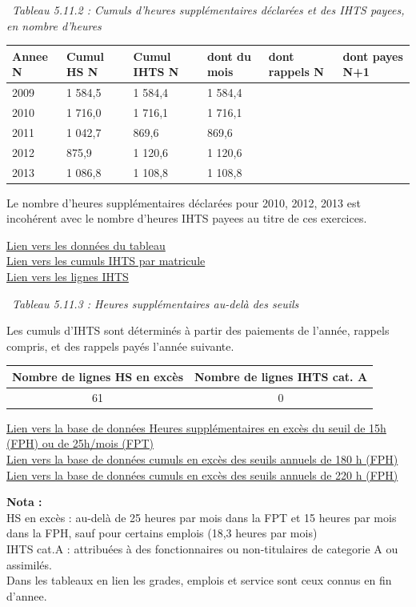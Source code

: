 ~\emph{Tableau 5.11.2 : Cumuls d'heures supplémentaires déclarées et des
IHTS payees, en nombre d'heures}

\begin{longtable}[]{@{}llllll@{}}
\toprule
Annee N & Cumul HS N & Cumul IHTS N & dont du mois & dont rappels N &
dont payes N+1\tabularnewline
\midrule
\endhead
2009 & 1 584,5 & 1 584,4 & 1 584,4 & &\tabularnewline
2010 & 1 716,0 & 1 716,1 & 1 716,1 & &\tabularnewline
2011 & 1 042,7 & 869,6 & 869,6 & &\tabularnewline
2012 & 875,9 & 1 120,6 & 1 120,6 & &\tabularnewline
2013 & 1 086,8 & 1 108,8 & 1 108,8 & &\tabularnewline
\bottomrule
\end{longtable}

Le nombre d'heures supplémentaires déclarées pour 2010, 2012, 2013 est
incohérent avec le nombre d'heures IHTS payees au titre de ces
exercices.

\href{../Bases/Reglementation/CumHS.csv}{Lien vers les données du
tableau}\\
\href{../Bases/Reglementation/lignes.IHTS.tot.csv}{Lien vers les cumuls
IHTS par matricule}\\
\href{../Bases/Reglementation/lignes.IHTS.csv}{Lien vers les lignes IHTS}

~\emph{Tableau 5.11.3 : Heures supplémentaires au-delà des seuils}

Les cumuls d'IHTS sont déterminés à partir des paiements de l'année,
rappels compris, et des rappels payés l'année suivante.

\begin{longtable}[]{@{}cc@{}}
\toprule
Nombre de lignes HS en excès & Nombre de lignes IHTS cat.
A\tabularnewline
\midrule
\endhead
61 & 0\tabularnewline
\bottomrule
\end{longtable}

\href{../Bases/Reglementation/HS.sup.25.csv}{Lien vers la base de données
Heures supplémentaires en excès du seuil de 15h (FPH) ou de 25h/mois
(FPT)}\\
\href{../Bases/Reglementation/Depassement.seuil.180h.csv}{Lien vers la base
de données cumuls en excès des seuils annuels de 180 h (FPH)}\\
\href{../Bases/Reglementation/Depassement.seuil.220h.csv}{Lien vers la base
de données cumuls en excès des seuils annuels de 220 h (FPH)}

\textbf{Nota :}\\
HS en excès : au-delà de 25 heures par mois dans la FPT et 15 heures par
mois dans la FPH, sauf pour certains emplois (18,3 heures par mois)\\
IHTS cat.A : attribuées à des fonctionnaires ou non-titulaires de
categorie A ou assimilés.\\
Dans les tableaux en lien les grades, emplois et service sont ceux
connus en fin d'annee.

